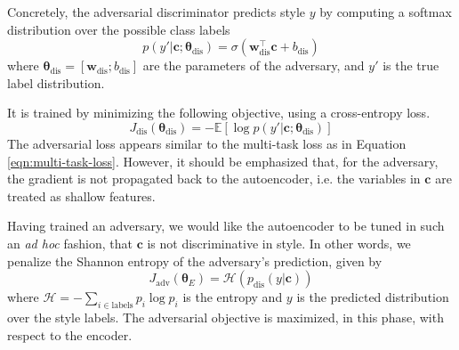 \documentclass[11pt,a4paper]{article}
\newcommand{\loss}[1]{J_\text{#1}}
\begin{document}
Concretely, the adversarial discriminator predicts style $y$ by computing a softmax distribution over the possible class labels
\begin{equation}
	p(y' | \bm c; \bm\theta_\text{dis}) = \sigma(\bm w_\text{dis}^\top \bm c + b_\text{dis})
\end{equation}
where $\bm\theta_\text{dis}=[\bm w_\text{dis}; b_\text{dis}]$ are the parameters of the adversary, and $y'$ is the true label distribution.

It is trained by minimizing the following objective, using a cross-entropy loss.
\begin{equation} \label{eqn:adv-disc-loss}
	\loss{dis}(\bm\theta_\text{dis}) =
	- \mathbb{E} [\log p(y' | \bm c; \bm\theta_\text{dis})]
\end{equation}
The adversarial loss appears similar to the multi-task loss as in Equation \ref{eqn:multi-task-loss}. However, it should be emphasized that, for the adversary, the gradient is not propagated back to the autoencoder, i.e. the variables in $\bm c$ are treated as shallow features.

Having trained an adversary, we would like the autoencoder to be tuned in such an \textit{ad hoc} fashion, that $\bm c$ is not discriminative in style. In other words, we penalize the Shannon entropy of the adversary's prediction, given by
\begin{equation}
	\loss{adv}(\bm\theta_E)=\mathcal{H}(p_\text{dis}(y|\bm c))
\end{equation}
where $\mathcal{H}=-\sum_{i\in\text{labels}}p_i\log p_i$ is the entropy and $y$ is the predicted distribution over the style labels. The adversarial objective is maximized, in this phase, with respect to the encoder.
\end{document}
